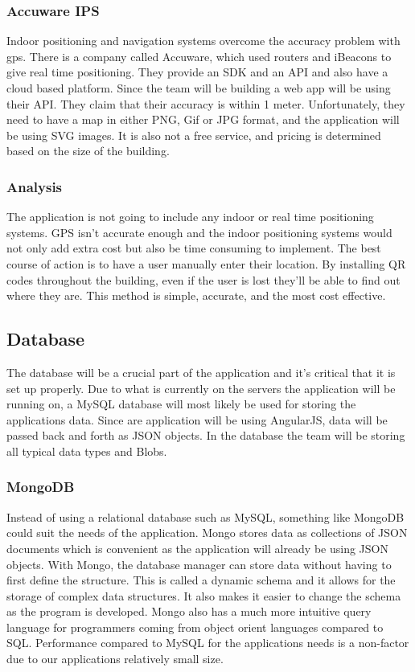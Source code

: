 \documentclass[letterpaper,10pt,titlepage, onecolumn, compsoc]{IEEEtran}
\begin{document}
\subsubsection{Accuware IPS}
Indoor positioning and navigation systems overcome the accuracy problem with gps. There is a company called Accuware, which used routers and iBeacons to give real time positioning. They provide an SDK and an API and also have a cloud based platform. Since the team will be building a web app will be using their API. They claim that their accuracy is within 1 meter. Unfortunately, they need to have a map in either PNG, Gif or JPG format, and the application will be using SVG images. It is also not a free service, and pricing is determined based on the size of the building.
\cite{Accuware}


\subsubsection{Analysis}
The application is not going to include any indoor or real time positioning systems. GPS isn’t accurate enough and the indoor positioning systems would not only add extra cost but also be time consuming to implement. The best course of action is to have a user manually enter their location. By installing QR codes throughout the building, even if the user is lost they’ll be able to find out where they are. This method is simple, accurate, and the most cost effective. 

\subsection{Database}
The database will be a crucial part of the application and it’s critical that it is set up properly. Due to what is currently on the servers the application will be running on, a MySQL database will most likely be used for storing the applications data. Since are application will be using AngularJS, data will be passed back and forth as JSON objects. In the database the team will be storing all typical data types and Blobs. 


\subsubsection{MongoDB}

Instead of using a relational database such as MySQL, something like MongoDB could suit the needs of the application. Mongo stores data as collections of JSON documents which is convenient as the application will already be using JSON objects. With Mongo, the database manager can store data without having to first define the structure. This is called a dynamic schema and it allows for the storage of complex data structures.  It also makes it easier to change the schema as the program is developed. Mongo also has a much more intuitive query language for programmers coming from object orient languages compared to SQL. Performance compared to MySQL for the applications needs is a non-factor due to our applications relatively small size.\cite{mongoDB}
\end{document}
